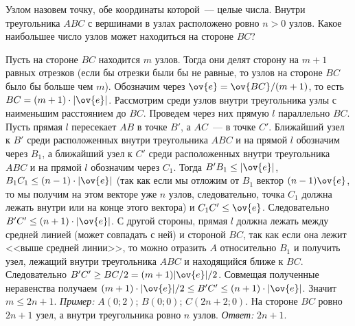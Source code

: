 \problem{}
Узлом назовем точку, обе координаты которой~--- целые числа.
Внутри треугольника $ABC$ с вершинами в узлах расположено ровно $n > 0$ узлов.
Какое наибольшее число узлов может находиться на стороне $BC$?

\solution
Пусть на стороне $BC$ находится $m$ узлов.
Тогда они делят сторону на $m + 1$ равных отрезков
(если бы отрезки были бы не равные, то узлов на стороне $BC$ было бы больше чем
$m$).
Обозначим через $\ov{e} = \ov{BC} / (m + 1)$, то есть
$BC = (m + 1) \cdot |\ov{e}|$.
Рассмотрим среди узлов внутри треугольника узлы с наименьшим расстоянием до
$BC$.
Проведем через них прямую $l$ параллельно $BC$.
Пусть прямая $l$ пересекает $AB$ в точке $B'$, а $AC$~--- в точке $C'$.
Ближайший узел к $B'$ среди расположенных внутри треугольника $ABC$ и на прямой
$l$ обозначим через $B_1$, а ближайший узел к $C'$ среди расположенных внутри
треугольника $ABC$ и на прямой $l$ обозначим через $C_1$.
Тогда $B'B_1 \leq |\ov{e}|$, $B_1C_1 \leq (n - 1) \cdot |\ov{e}|$
(так как если мы отложим от $B_1$ вектор $(n - 1) \ov{e}$, то мы получим на
этом векторе уже $n$ узлов, следовательно, точка $C_1$ должна лежать внутри или
на конце этого вектора)
и $C_1C' \leq \ov{e}$.
Следовательно $B'C' \leq (n + 1) \cdot |\ov{e}|$.
С другой стороны, прямая $l$ должна лежать между средней линией
(может совпадать с ней) и стороной $BC$, так как если она лежит
<<выше средней линии>>, то можно отразить $A$ относительно $B_1$ и получить
узел, лежащий внутри треугольника $ABC$ и находящийся ближе к $BC$.
Следовательно $B'C' \geq BC / 2 = (m + 1) |\ov{e}| / 2$.
Совмещая полученные неравенства получаем
$(m + 1) \cdot |\ov{e}| / 2 \leq B'C' \leq (n + 1) \cdot |\ov{e}|$.
Значит $m \leq 2 n + 1$.
\emph{Пример:} $A(0; 2)$; $B(0; 0)$; $C(2 n + 2; 0)$.
На стороне $BC$ ровно $2 n + 1$ узел, а внутри треугольника ровно $n$ узлов.
\emph{Ответ:} $2 n + 1$.

\endproblem
